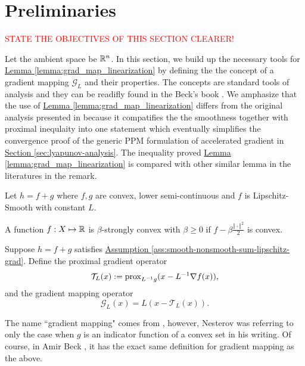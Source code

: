 \documentclass[12pt]{article}
\begin{document}
    
\section{Preliminaries}\label{sec:preliminaries}

    \textcolor{red}{STATE THE OBJECTIVES OF THIS SECTION CLEARER!}

    Let the ambient space be $\mathbb R^n$. 
    In this section, we build up the necessary tools for 
    \hyperref[lemma:grad_map_linearization]{Lemma \ref*{lemma:grad_map_linearization}}
    by defining the the concept of a gradient mapping $\mathcal G_L$ and their properties. 
    The concepts are standard tools of analysis and they can be readifly found in the Beck's book \cite{beck_first-order_2017}. 
    We amphasize that the use of 
    \hyperref[lemma:grad_map_linearization]{Lemma \ref*{lemma:grad_map_linearization}}
    differs from the original analysis presented in \cite{ahn_understanding_2022} because it compatifies the the smoothness together with proximal inequlaity into one statement which eventually simplifies the convergence proof of the generic PPM formulation of accelerated gradient in
    \hyperref[sec:lyapunov-analysis]{Section \ref*{sec:lyapunov-analysis}}. 
    The inequality proved \hyperref[lemma:grad_map_linearization]{Lemma \ref*{lemma:grad_map_linearization}} 
    is compared with other similar lemma in the literatures in the remark. 
    
    \begin{assumption}\label{ass:smooth-nonsmooth-sum-lipschitz-grad}
        Let $h = f + g$ where $f, g$ are convex, lower semi-continuous and $f$ is Lipschitz-Smooth with constant $L$. 
    \end{assumption}
    \begin{definition}
        A function $f: X \mapsto \mathbb R$ is $\beta$-strongly convex
        with $\beta\geq 0$ if $f - \beta \frac{\Vert \cdot\Vert^2}{2}$ is convex.
    \end{definition}

    \begin{definition}
        \label{def:gradient_mapping}
        Suppose $h = f + g$ satisfies 
        \hyperref[ass:smooth-nonsmooth-sum-lipschitz-grad]
        {Assumption \ref*{ass:smooth-nonsmooth-sum-lipschitz-grad}}. 
        Define the proximal gradient operator
        $$
            \mathcal T_L(x) := \operatorname{prox}_{L^{-1}g}(x - L^{-1}\nabla f(x)),
        $$
        and the gradient mapping operator
        $$
            \mathcal G_L(x) = L(x - \mathcal T_L(x)). 
        $$
    \end{definition}
    \begin{remark}
        The name ``gradient mapping" comes from \cite[(2.2.54)]{nesterov_lectures_2018}, however, Nesterov was referring to only the case when $g$ is an indicator function of a convex set in his writing. 
        Of course, in Amir Beck \cite[10.3.2]{beck_first-order_2017}, it has the exact same definition for gradient mapping as the above. 
    \end{remark}
\end{document}
